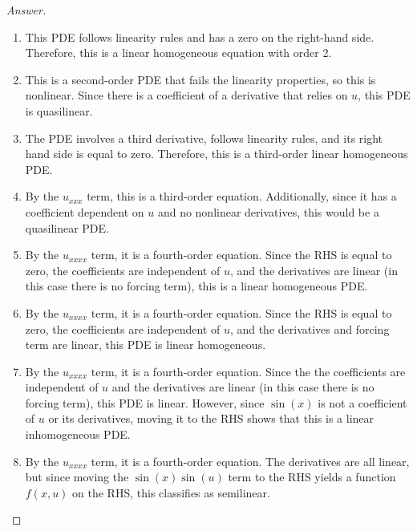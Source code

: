 \documentclass{article}
\theoremstyle{definition}
\renewcommand\qedsymbol{$\blacksquare$}
\newenvironment{ans}{\begin{proof}[Answer]\renewcommand{\qedsymbol}{}}{\end{proof}}
\begin{document}
	\begin{ans}
		\begin{enumerate}[resume*=answers]
			\item This PDE follows linearity rules and has a zero on the right-hand side. Therefore, this is a linear homogeneous equation with order 2.
			
			\item This is a second-order PDE that fails the linearity properties, so this is nonlinear. Since there is a coefficient of a derivative that relies on $u$, this PDE is quasilinear.
			
			\item The PDE involves a third derivative, follows linearity rules, and its right hand side is equal to zero. Therefore, this is a third-order linear homogeneous PDE.
			
			\item By the $u_{xxx}$ term, this is a third-order equation. Additionally, since it has a coefficient dependent on $u$ and no nonlinear derivatives, this would be a quasilinear PDE.
			
			\item By the $u_{xxxx}$ term, it is a fourth-order equation. Since the RHS is equal to zero, the coefficients are independent of $u$, and the derivatives are linear (in this case there is no forcing term), this is a linear homogeneous PDE.
			
			\item By the $u_{xxxx}$ term, it is a fourth-order equation. Since the RHS is equal to zero, the coefficients are independent of $u$, and the derivatives and forcing term are linear, this PDE is linear homogeneous.
			
			\item By the $u_{xxxx}$ term, it is a fourth-order equation. Since the the coefficients are independent of $u$ and the derivatives are linear (in this case there is no forcing term), this PDE is linear. However, since $\sin(x)$ is not a coefficient of $u$ or its derivatives, moving it to the RHS shows that this is a linear inhomogeneous PDE.
			
			\item By the $u_{xxxx}$ term, it is a fourth-order equation. The derivatives are all linear, but since moving the $\sin(x)\sin(u)$ term to the RHS yields a function $f(x,u)$ on the RHS, this classifies as semilinear.
		\end{enumerate}
	\end{ans}
	
\end{document}
